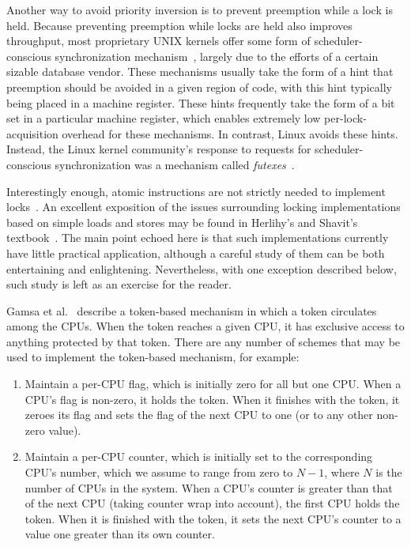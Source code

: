 Another way to avoid priority inversion is to prevent preemption
while a lock is held.
Because preventing preemption while locks are held also improves throughput,
most proprietary UNIX kernels offer some form of scheduler-conscious
synchronization mechanism~\cite{Kontothanassis97a},
largely due to the efforts of a certain sizable database vendor.
These mechanisms usually take the form of a hint that preemption
should be avoided in a given region of code, with this hint typically
being placed in a machine register.
These hints frequently take the form of a bit set in a particular
machine register, which enables extremely low per-lock-acquisition overhead
for these mechanisms.
In contrast, Linux avoids these hints.
Instead, the Linux kernel community's response to requests for
scheduler-conscious synchronization was a mechanism called
\emph{futexes}~\cite{HubertusFrancke2002Futex,IngoMolnar2006RobustFutexes,StevenRostedt2006piFutexes,UlrichDrepper2011Futexes}.

Interestingly enough, atomic instructions are not strictly needed to
implement locks~\cite{Dijkstra65a,Lamport74a}.
An excellent exposition of the issues surrounding locking implementations
based on simple loads and stores may be found in Herlihy's and
Shavit's textbook~\cite{HerlihyShavit2008Textbook,HerlihyShavit2020Textbook}.
The main point echoed here is that such implementations currently
have little practical application, although a careful study of
them can be both entertaining and enlightening.
Nevertheless, with one exception described below, such study is left
as an exercise for the reader.

Gamsa et al.~\cite[Section 5.3]{Gamsa99} describe a token-based
mechanism in which a token circulates among the CPUs.
When the token reaches a given CPU, it has exclusive
access to anything protected by that token.
There are any number of schemes that may be used to implement
the token-based mechanism, for example:

\begin{enumerate}
\item	Maintain a per-CPU flag, which is initially
	zero for all but one CPU\@.
	When a CPU's flag is non-zero, it holds the token.
	When it finishes with the token, it zeroes its flag and
	sets the flag of the next CPU to one (or to any other
	non-zero value).
\item	Maintain a per-CPU counter, which is initially set
	to the corresponding CPU's number, which we assume
	to range from zero to $N-1$, where $N$ is the number
	of CPUs in the system.
	When a CPU's counter is greater than that of the next
	CPU (taking counter wrap into account), the first CPU holds the token.
	When it is finished with the token, it sets the next
	CPU's counter to a value one greater than its own counter.
\end{enumerate}

